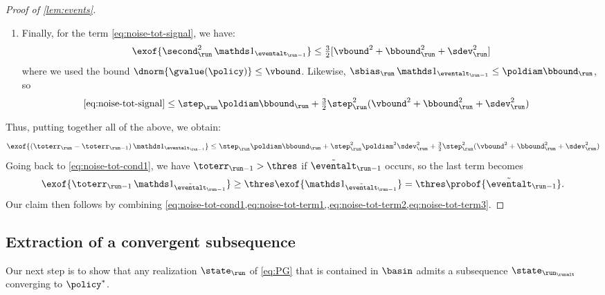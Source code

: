 \begin{proof}[Proof of \cref{lem:events}]
\begin{enumerate}
\item
Finally, for the term \eqref{eq:noise-tot-signal}, we have:
\begin{align}
\label{eq:noise-tot-term1}
\exof{\curr[\second]^{2} \one_{\prev[\eventalt]}}
	\leq \tfrac{3}{2}  \bracks{ \vbound^{2} + \curr[\bbound]^{2} + \curr[\sdev]^{2} }
\end{align}
where we used the bound $\dnorm{\gvalue(\policy)} \leq \vbound$.
Likewise, $\curr[\sbias] \one_{\prev[\eventalt]} \leq \poldiam \curr[\bbound]$, so
\begin{align}
\label{eq:noise-tot-term2}
\eqref{eq:noise-tot-signal}
	&\leq \curr[\step] \poldiam \curr[\bbound]
		+ \tfrac{3}{2}  \curr[\step]^{2} (\vbound^{2} + \curr[\bbound]^{2} + \curr[\sdev]^{2})
\end{align}
\end{enumerate}
Thus, putting together all of the above, we obtain:
\begin{equation}
\exof{(\curr[\toterr] - \prev[\toterr]) \one_{\prev[\eventalt]}}
	\leq \curr[\step] \poldiam \curr[\bbound]
		+ \curr[\step]^{2} \poldiam^{2} \curr[\sdev]^{2}
		+ \tfrac{3}{2}  \curr[\step]^{2} (\vbound^{2} + \curr[\bbound]^{2} + \curr[\sdev]^{2})
\end{equation}
Going back to \eqref{eq:noise-tot-cond1}, we have $\prev[\toterr] > \thres$ if $\prev[\tilde\eventalt]$ occurs, so the last term becomes
\begin{equation}
\label{eq:noise-tot-term3}
\exof{\prev[\toterr] \one_{\prev[\tilde\eventalt]}}
	\geq \thres \exof{\one_{\prev[\tilde\eventalt]}}
	= \thres \probof{\prev[\tilde\eventalt]}.
\end{equation}
Our claim then follows by combining \cref{eq:noise-tot-cond1,eq:noise-tot-term1,,eq:noise-tot-term2,eq:noise-tot-term3}.
\end{proof}



\subsection{Extraction of a convergent subsequence}

Our next step is to show that any realization $\curr$ of \eqref{eq:PG} that is contained in $\basin$ admits a subsequence $\state_{\run_{\runalt}}$ converging to $\eq$.

